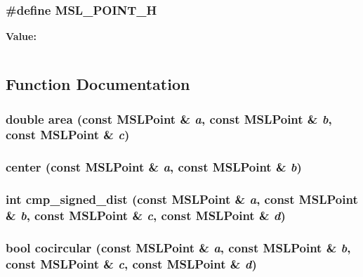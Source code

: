 \subsubsection{\setlength{\rightskip}{0pt plus 5cm}\#define MSL\_\-POINT\_\-H}\label{point_8h_a0}


{\bf Value:}\footnotesize\begin{verbatim}
\end{verbatim}\normalsize 


\subsection{Function Documentation}
\subsubsection{\setlength{\rightskip}{0pt plus 5cm}double area (const {\bf MSLPoint} \& {\em a}, const {\bf MSLPoint} \& {\em b}, const {\bf MSLPoint} \& {\em c})\hspace{0.3cm}{\tt  [inline]}}\label{point_8h_a7}


\subsubsection{ center (const {\bf MSLPoint} \& {\em a}, const {\bf MSLPoint} \& {\em b})\hspace{0.3cm}{\tt  [inline]}}\label{point_8h_a3}


\subsubsection{\setlength{\rightskip}{0pt plus 5cm}int cmp\_\-signed\_\-dist (const {\bf MSLPoint} \& {\em a}, const {\bf MSLPoint} \& {\em b}, const {\bf MSLPoint} \& {\em c}, const {\bf MSLPoint} \& {\em d})\hspace{0.3cm}{\tt  [inline]}}\label{point_8h_a6}


\subsubsection{\setlength{\rightskip}{0pt plus 5cm}bool cocircular (const {\bf MSLPoint} \& {\em a}, const {\bf MSLPoint} \& {\em b}, const {\bf MSLPoint} \& {\em c}, const {\bf MSLPoint} \& {\em d})\hspace{0.3cm}{\tt  [inline]}}\label{point_8h_a14}


